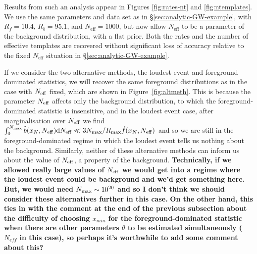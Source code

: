 \documentclass[aps,prd]{revtex4-1}
\newcommand{\ilya}[1]{{\color{red} \bf #1}}
\newcommand{\jon}[1]{{\color{green} \bf  #1}}
\begin{document}
Results from such an analysis appear in Figures \ref{fig:rates-nt} and
\ref{fig:ntemplates}.  We use the same parameters and data set as in
\S \ref{sec:analytic-GW-example}, with $R_f = 10.4$, $R_b = 95.1$, and
$N_\mathrm{eff} = 1000$, but now allow $N_\mathrm{eff}$ to be a
parameter of the background distribution, with a flat prior.  Both the
rates and the number of effective templates are recovered without
significant loss of accuracy relative to the fixed $N_\mathrm{eff}$
situation in \S \ref{sec:analytic-GW-example}.  

If we consider the two alternative methods, the loudest event and
foreground dominated statistics, we will recover the same foreground
distributions as in the case with $N_{\rm eff}$ fixed, which are shown
in Figure~\ref{fig:altmeth}. This is because the parameter $N_{\rm
  eff}$ affects only the background distribution, to which the
foreground-dominated statistic is insensitive, and in the loudest
event case, after marginalisation over $N_{\rm eff}$ we find
$\int_0^{N_{\rm max}} \hat{b}(x_N,N_{\rm eff}) {\rm d}N_{\rm eff} \ll
3 N_{\rm max}/R_{\rm max} \hat{f}(x_N, N_{\rm eff})$ and so we are
still in the foreground-dominated regime in which the loudest event
tells us nothing about the background. Similarly, neither of these
alternative methods can inform us about the value of $N_{\rm eff}$, a
property of the background. \jon{Technically, if we allowed really
  large values of $N_{\rm eff}$ we would get into a regime where the
  loudest event could be background and we'd get something here. But,
  we would need $N_{\rm max} \sim 10^{20}$ and so I don't think we
  should consider these alternatives further in this case.} \ilya{On the other hand, this ties in with the comment at the end of the previous subsection about the difficulty of choosing $x_{min}$ for the foreground-dominated statistic when there are other parameters $\theta$ to be estimated simultaneously ($N_{eff}$ in this case), so perhaps it's worthwhile to add some comment about this?}
\end{document}
